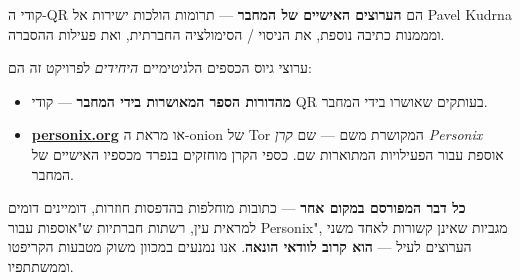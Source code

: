 \begin{minipage}[t]{0.60\textwidth}
\vspace{0pt}
\begin{mdframed}[
  linewidth=0.7pt,roundcorner=5pt,
  innerleftmargin=10pt,innerrightmargin=10pt,
  innertopmargin=8pt,innerbottommargin=8pt,
  skipabove=0pt,skipbelow=0pt,
  linecolor=cbwarning!50,backgroundcolor=cbwarning!5,
  nobreak=true,
  needspace=4\baselineskip,
]
\footnotesize
קודי ה-QR הם \textbf{הערוצים האישיים של המחבר} --- תרומות הולכות ישירות אל Pavel Kudrna ומממנות כתיבה נוספת, את הניסוי / הסימולציה החברתית, ואת פעילות ההסברה.

\smallskip
ערוצי גיוס הכספים הלגיטימיים \emph{היחידים} לפרויקט זה הם:

\smallskip
\begin{itemize}
\setlength{\itemsep}{0pt}
\setlength{\topsep}{0pt}
\item \textbf{מהדורות הספר המאושרות בידי המחבר} --- קודי QR בעותקים שאושרו בידי המחבר.
\item \href{https://personix.org}{\textbf{personix.org}} או מראת ה-onion של Tor המקושרת משם --- שם \emph{קרן Personix} אוספת עבור הפעילויות המתוארות שם. כספי הקרן מוחזקים בנפרד מכספיו האישיים של המחבר.
\end{itemize}

\smallskip
\textbf{כל דבר המפורסם במקום אחר} --- כתובות מוחלפות בהדפסות חוזרות, דומיינים דומים למראית עין, רשתות חברתיות ש"אוספות עבור Personix", מגביות שאינן קשורות לאחד משני הערוצים לעיל --- \textbf{הוא קרוב לוודאי הונאה}. אנו נמנעים במכוון משוק מטבעות הקריפטו וממשתתפיו.
\end{mdframed}
\end{minipage}

\clearpage

